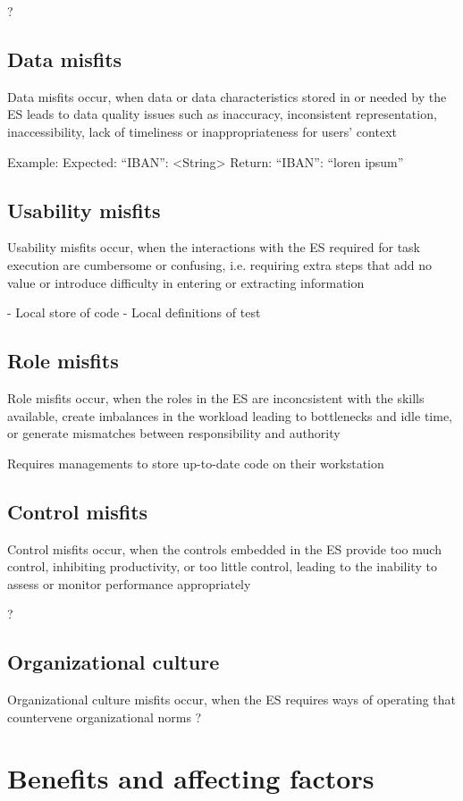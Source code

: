 ?

\subsection{Data misfits}
Data misfits occur, when data or data characteristics stored in or needed by the ES leads to data quality issues such as inaccuracy, inconsistent representation, inaccessibility, lack of timeliness or inappropriateness for users' context 

Example:
Expected: {“IBAN”: <String>}
Return: {“IBAN”: “loren ipsum”}

\subsection{Usability misfits}
Usability misfits occur, when the interactions with the ES required for task execution are cumbersome or confusing, i.e. requiring extra steps that add no value or introduce difficulty in entering or extracting information 

- Local store of code
- Local definitions of test

\subsection{Role misfits}
Role misfits occur, when the roles in the ES are inconcsistent with the skills available, create imbalances in the workload leading to bottlenecks and idle time, or generate mismatches between responsibility and authority 

Requires managements to store up-to-date code on their workstation

\subsection{Control misfits}
Control misfits occur, when the controls embedded in the ES provide too much control, inhibiting productivity, or too little control, leading to the inability to assess or monitor performance appropriately 

?

\subsection{Organizational culture}
Organizational culture misfits occur, when the ES requires ways of operating that countervene organizational norms 
?


\section{Benefits and affecting factors}
